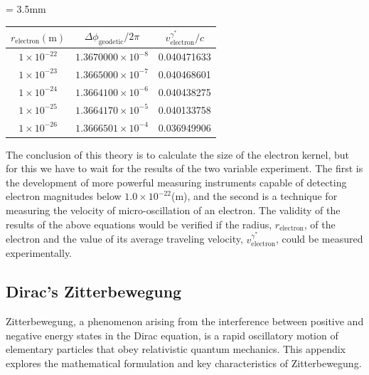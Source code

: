\documentclass[%
 reprint,
 amsmath,amssymb,
 aps,
]{revtex4-1}
\numberwithin{equation}{section}%
\begin{document}
\begin{center}
    \begin{threeparttable}
        \caption{The velocity and the radius of an electron}
        \label{table_1}
        \tabcolsep = 3.5mm
        \renewcommand\arraystretch{1.2}
        \begin{tabular}{ccc}
            \hline
        $ r_{\mathrm{electron}} {\mathrm{(m)}}$ & $\Delta \phi_{\mathrm{geodetic}}/{2 \pi}$ & $ v_{\text{electron}}^{\gamma^{*}} / c$ \\       \hline
        $1 \times 10^{-22}$ & $1.3670000 \times 10^{-8}$ & 0.040471633 \\ 
        $1 \times 10^{-23}$ & $1.3665000 \times 10^{-7}$ & 0.040468601 \\ 
        $1 \times 10^{-24}$ & $1.3664100 \times 10^{-6}$ & 0.040438275 \\ 
        $1 \times 10^{-25}$ & $1.3664170 \times 10^{-5}$ & 0.040133758 \\ 
        $1 \times 10^{-26}$ & $1.3666501 \times 10^{-4}$ & 0.036949906 \\ 
            \hline
        \end{tabular}
    \end{threeparttable}
\end{center}

The conclusion of this theory is to calculate the size of the electron kernel, but for this we have to wait for the results of the two variable experiment. The first is the development of more powerful measuring instruments capable of detecting electron magnitudes below $1.0 \times 10^{-22}$(m), and the second is a technique for measuring the velocity of micro-oscillation of an electron. The validity of the results of the above equations would be verified if the radius, $r_{\mathrm{electron}}$, of the electron and the value of its average traveling velocity, $ v_{\text{electron}}^{\gamma^{*}} $, could be measured experimentally.


\subsection{\label{sec:Dirac's Zitterbewegung}Dirac's Zitterbewegung}

Zitterbewegung, a phenomenon arising from the interference between positive and negative energy states in the Dirac equation, is a rapid oscillatory motion of elementary particles that obey relativistic quantum mechanics. This appendix explores the mathematical formulation and key characteristics of Zitterbewegung.
\end{document}
